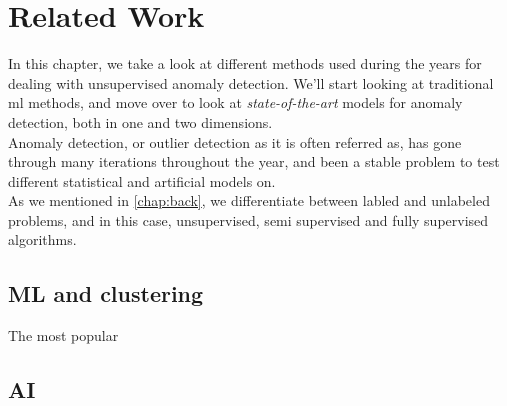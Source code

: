 \chapter{Related Work}
\label{chap:relwork}

In this chapter, we take a look at different methods used during the years for dealing with unsupervised anomaly detection. We'll start looking at traditional \acrlong{ml} methods, and move over to look at \textit{state-of-the-art} models for anomaly detection, both in one and two dimensions. \\


Anomaly detection, or outlier detection as it is often referred as, has gone through many iterations throughout the year, and been a stable problem to test different statistical and artificial models on. \\ 

As we mentioned in \ref{chap:back}, we differentiate between labled and unlabeled problems, and in this case, unsupervised, semi supervised and fully supervised algorithms.

\section{ML and clustering}
The most popular 

\section{AI}











